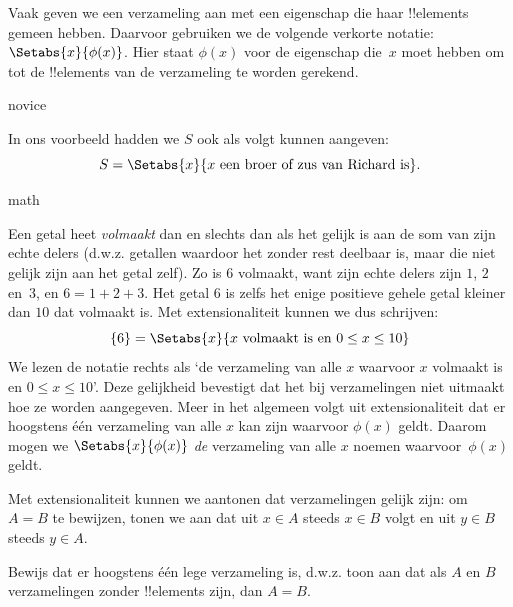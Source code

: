 \documentclass[../../../include/open-logic-section]{subfiles}
\begin{document}
Vaak geven we een verzameling aan met een eigenschap die haar
!!{element}s gemeen hebben. Daarvoor gebruiken we de volgende verkorte
notatie: $\Setabs{x}{\phi(x)}$. Hier staat $\phi(x)$ voor de
eigenschap die~$x$ moet hebben om tot de !!{element}s van de
verzameling te worden gerekend.

\begin{tagblock}{novice}
\begin{ex}
In ons voorbeeld hadden we $S$ ook als volgt kunnen aangeven:
\[
S = \Setabs{x}{x \text{ een broer of zus van Richard is}}.
\]
\end{ex}
\end{tagblock}

\begin{tagblock}{math}
\begin{ex}
Een getal heet \emph{volmaakt} dan en slechts dan als het gelijk is
aan de som van zijn echte delers (d.w.z. getallen waardoor het zonder
rest deelbaar is, maar die niet gelijk zijn aan het getal zelf). Zo is
$6$ volmaakt, want zijn echte delers zijn $1$, $2$ en~$3$, en
$6 = 1 + 2 + 3$. Het getal $6$ is zelfs het enige positieve gehele
getal kleiner dan $10$ dat volmaakt is. Met extensionaliteit kunnen we
dus schrijven:
\[
	\{6\} = \Setabs{x}{x\text{ volmaakt is en }0 \leq x \leq 10}
\]
We lezen de notatie rechts als ‘de verzameling van alle $x$ waarvoor
$x$ volmaakt is en $0 \leq x \leq 10$’. Deze gelijkheid bevestigt dat
het bij verzamelingen niet uitmaakt hoe ze worden aangegeven. Meer in
het algemeen volgt uit extensionaliteit dat er hoogstens één verzameling
van alle $x$ kan zijn waarvoor $\phi(x)$ geldt. Daarom mogen we
$\Setabs{x}{\phi(x)}$ \emph{de} verzameling van alle $x$ noemen
waarvoor~$\phi(x)$ geldt.
\end{ex}
\end{tagblock}

Met extensionaliteit kunnen we aantonen dat verzamelingen gelijk zijn: om
$A = B$ te bewijzen, tonen we aan dat uit $x \in A$ steeds $x \in B$ volgt
en uit $y \in B$ steeds $y \in A$.

\begin{prob}
Bewijs dat er hoogstens één lege verzameling is, d.w.z. toon aan dat
als $A$ en $B$ verzamelingen zonder !!{element}s zijn, dan $A = B$.
\end{prob}
\end{document}
